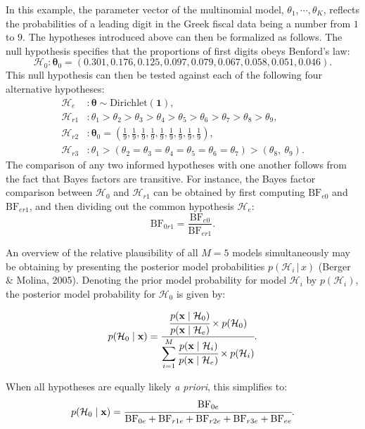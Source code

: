 \documentclass[
  english,
  man,floatsintext]{apa6}
\begin{document}
In this example, the parameter vector of the multinomial model, \(\theta_1, \cdots, \theta_K\), reflects the probabilities of a leading digit in the Greek fiscal data being a number from \(1\) to \(9\). The hypotheses introduced above can then be formalized as follows. The null hypothesis specifies that the proportions of first digits obeys Benford's law:
\[\mathcal{H}_0 : \boldsymbol{\theta}_0 = (0.301, 0.176, 0.125, 0.097, 0.079, 0.067, 0.058, 0.051, 0.046).\] This null hypothesis can then be tested against each of the following four alternative hypotheses:
\begin{align*}
\mathcal{H}_e &: \boldsymbol{\theta} \sim \text{Dirichlet}(\mathbf{1}), \\
\mathcal{H}_{r1} &: \theta_1 > \theta_2 > \theta_3 > \theta_4 > \theta_5 > \theta_6 > \theta_7 > \theta_8 > \theta_9, \\
\mathcal{H}_{r2} &:  \boldsymbol{\theta}_0 = \left(\frac{1}{9}, \frac{1}{9}, \frac{1}{9}, \frac{1}{9}, \frac{1}{9}, \frac{1}{9}, \frac{1}{9}, \frac{1}{9}, \frac{1}{9}\right),\\
\mathcal{H}_{r3} &:  \theta_1 > (\theta_2 = \theta_3 = \theta_4 = \theta_5 = \theta_6 = \theta_7) > (\theta_8, \ \theta_9).
\end{align*}
The comparison of any two informed hypotheses with one another follows from the fact that Bayes factors are transitive. For instance, the Bayes factor comparison between \(\mathcal{H}_{0}\) and \(\mathcal{H}_{r1}\) can be obtained by first computing \(\text{BF}_{e0}\) and \(\text{BF}_{er1}\), and then dividing out the common hypothesis \(\mathcal{H}_{e}\):
\[\text{BF}_{0r1} = \frac{\text{BF}_{e0}}{\text{BF}_{er1}}.\]

An overview of the relative plausibility of all \(M=5\) models simultaneously may be obtaining by presenting the posterior model probabilities \(p(\mathcal{H}_i \, | \, x)\) (Berger \& Molina, 2005). Denoting the prior model probability for model \(\mathcal{H}_i\) by \(p(\mathcal{H}_i)\), the posterior model probability for \(\mathcal{H}_0\) is given by:

\[ p(\mathcal{H}_0 \mid \mathbf{x}) = \cfrac{\cfrac{p(\mathbf{x} \mid \mathcal{H}_0)}{p(\mathbf{x} \mid \mathcal{H}_e)} \times p(\mathcal{H}_0)}{\displaystyle\sum\limits_{i = 1}^M \cfrac{p(\mathbf{x} \mid \mathcal{H}_i)}{p(\mathbf{x} \mid \mathcal{H}_e)} \times p(\mathcal{H}_i)}.\]

\noindent When all hypotheses are equally likely \emph{a priori}, this simplifies to:
\[
p(\mathcal{H}_0 \mid \mathbf{x}) = \cfrac{\text{BF}_{0e}}{\text{BF}_{0e} + \text{BF}_{r1e} + \text{BF}_{r2e} + \text{BF}_{r3e} + \text{BF}_{ee}} .
\]
\end{document}
